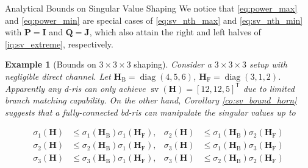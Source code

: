 \documentclass[journal]{IEEEtran}
\DeclareMathOperator{\diag}{diag}
\DeclareMathOperator{\sv}{sv}
\newtheorem{example}{Example}
\begin{document}
\begin{section}{Analytical Bounds on Singular Value Shaping}
		We notice that \eqref{eq:power_max} and \eqref{eq:power_min} are special cases of \eqref{eq:sv_nth_max} and \eqref{eq:sv_nth_min} with $\mathbf{P} = \mathbf{I}$ and $\mathbf{Q} = \mathbf{J}$, which also attain the right and left halves of \eqref{iq:sv_extreme}, respectively.


		\begin{example}[Bounds on $3 \times 3 \times 3$ shaping]\label{eg:bounds}
			Consider a $3 \times 3 \times 3$ setup with negligible direct channel.
			Let $\mathbf{H}_\mathrm{B} = \diag(4, 5, 6)$, $\mathbf{H}_\mathrm{F} = \diag(3, 1, 2)$.
			Apparently any \gls{d}-\gls{ris} can only achieve $\sv(\mathbf{H}) = [12, 12, 5]^\mathsf{T}$ due to limited branch matching capability.
			On the other hand, Corollary \ref{co:sv_bound_horn} suggests that a fully-connected \gls{bd}-\gls{ris} can manipulate the singular values up to


			\begin{align*}
				\sigma_1(\mathbf{H}) &\leq \sigma_1(\mathbf{H}_\mathrm{B}) \sigma_1(\mathbf{H}_\mathrm{F}), & \sigma_2(\mathbf{H}) &\leq \sigma_1(\mathbf{H}_\mathrm{B}) \sigma_2(\mathbf{H}_\mathrm{F}) \\
				\sigma_2(\mathbf{H}) &\leq \sigma_2(\mathbf{H}_\mathrm{B}) \sigma_1(\mathbf{H}_\mathrm{F}), & \sigma_3(\mathbf{H}) &\leq \sigma_1(\mathbf{H}_\mathrm{B}) \sigma_3(\mathbf{H}_\mathrm{F}) \\
				\sigma_3(\mathbf{H}) &\leq \sigma_3(\mathbf{H}_\mathrm{B}) \sigma_1(\mathbf{H}_\mathrm{F}), & \sigma_3(\mathbf{H}) &\leq \sigma_2(\mathbf{H}_\mathrm{B}) \sigma_2(\mathbf{H}_\mathrm{F})
			\end{align*}



\end{example}
\end{section}
\end{document}
